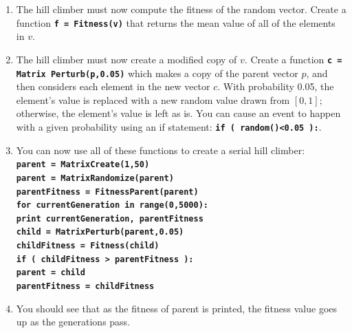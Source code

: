 \documentclass[12pt]{article}
\begin{document}
\begin{enumerate}
\item The hill climber must now compute the fitness of the random vector. Create a function \texttt{\textbf{f = Fitness(v)}} that returns the mean value of all of the elements in $v$.

\item The hill climber must now create a modified copy of $v$. Create a function \texttt{\textbf{c = Matrix Perturb(p,0.05)}} which makes a copy of the parent vector $p$, and then considers each element in the new vector $c$. With probability 0.05, the element's value is replaced with a new random value drawn from $[0,1]$; otherwise, the element's value is left as is. You can cause an event to happen with a given probability using an if statement: \textbf{\texttt{if ( random()<0.05 ):}}.

\item You can now use all of these functions to create a serial hill climber: \\
\textbf{\texttt{parent = MatrixCreate(1,50)}}\\
\textbf{\texttt{parent = MatrixRandomize(parent)}}\\
\textbf{\texttt{parentFitness = FitnessParent(parent)}}\\
\textbf{\texttt{for currentGeneration in range(0,5000):}}\\
\indent \textbf{\texttt{\hspace{1cm}print currentGeneration, parentFitness}}\\
\indent \textbf{\texttt{\hspace{1cm}child = MatrixPerturb(parent,0.05)}}\\
\indent \textbf{\texttt{\hspace{1cm}childFitness = Fitness(child)}}\\
\indent \textbf{\texttt{\hspace{1cm}if ( childFitness > parentFitness ):}}\\
\indent \textbf{\texttt{\hspace{2cm}parent = child}}\\
\indent \textbf{\texttt{\hspace{2cm}parentFitness = childFitness}}\\

\item You should see that as the fitness of parent is printed, the fitness value goes up as the generations pass.

\end{enumerate}
\end{document}
